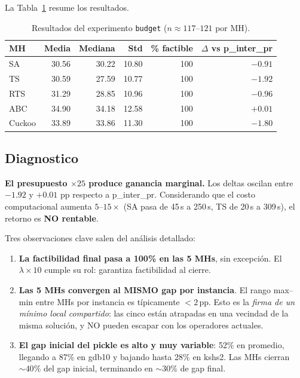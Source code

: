 \documentclass[11pt,a4paper]{article}
\theoremstyle{definition}
\theoremstyle{remark}
\begin{document}
La Tabla~\ref{tab:budget-resultados} resume los resultados.

\begin{table}[h]
\centering
\caption{Resultados del experimento \texttt{budget} ($n \approx 117$--$121$ por MH).}
\label{tab:budget-resultados}
\small
\begin{tabular}{lrrrrr}
\toprule
MH & Media & Mediana & Std & \% factible & $\Delta$ vs p\_inter\_pr \\
\midrule
SA      & 30.56 & 30.22 & 10.80 & 100 & $-0.91$ \\
TS      & 30.59 & 27.59 & 10.77 & 100 & $-1.92$ \\
RTS     & 31.29 & 28.85 & 10.96 & 100 & $-0.96$ \\
ABC     & 34.90 & 34.18 & 12.58 & 100 & $+0.01$ \\
Cuckoo  & 33.89 & 33.86 & 11.30 & 100 & $-1.80$ \\
\bottomrule
\end{tabular}
\end{table}

\subsection{Diagnostico}

\textbf{El presupuesto $\times 25$ produce ganancia marginal.} Los
deltas oscilan entre $-1.92$ y $+0.01$ pp respecto a p\_inter\_pr.
Considerando que el costo computacional aumenta $5$--$15 \times$
(SA pasa de 45\,s a 250\,s, TS de 20\,s a 309\,s), el retorno es
\textbf{NO rentable}.

Tres observaciones clave salen del análisis detallado:

\begin{enumerate}
\item \textbf{La factibilidad final pasa a 100\% en las 5 MHs}, sin
  excepción. El $\lambda \times 10$ cumple su rol: garantiza
  factibilidad al cierre.
\item \textbf{Las 5 MHs convergen al MISMO gap por instancia}. El
  rango max--min entre MHs por instancia es típicamente $<2$\,pp.
  Esto es la \emph{firma de un mínimo local compartido}: las cinco
  están atrapadas en una vecindad de la misma solución, y NO pueden
  escapar con los operadores actuales.
\item \textbf{El gap inicial del pickle es alto y muy variable}: 52\%
  en promedio, llegando a 87\% en gdb10 y bajando hasta 28\% en kshs2.
  Las MHs cierran $\sim 40\%$ del gap inicial, terminando en
  $\sim 30\%$ de gap final.
\end{enumerate}
\end{document}
